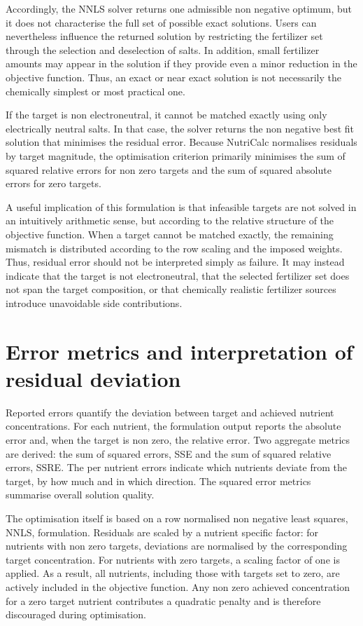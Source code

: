 \documentclass[
  letterpaper,
  DIV=11,
  numbers=noendperiod]{scrreprt}
\begin{document}
Accordingly, the NNLS solver returns one admissible non negative
optimum, but it does not characterise the full set of possible exact
solutions. Users can nevertheless influence the returned solution by
restricting the fertilizer set through the selection and deselection of
salts. In addition, small fertilizer amounts may appear in the solution
if they provide even a minor reduction in the objective function. Thus,
an exact or near exact solution is not necessarily the chemically
simplest or most practical one.

If the target is non electroneutral, it cannot be matched exactly using
only electrically neutral salts. In that case, the solver returns the
non negative best fit solution that minimises the residual error.
Because NutriCalc normalises residuals by target magnitude, the
optimisation criterion primarily minimises the sum of squared relative
errors for non zero targets and the sum of squared absolute errors for
zero targets.

A useful implication of this formulation is that infeasible targets are
not solved in an intuitively arithmetic sense, but according to the
relative structure of the objective function. When a target cannot be
matched exactly, the remaining mismatch is distributed according to the
row scaling and the imposed weights. Thus, residual error should not be
interpreted simply as failure. It may instead indicate that the target
is not electroneutral, that the selected fertilizer set does not span
the target composition, or that chemically realistic fertilizer sources
introduce unavoidable side contributions.

\section{Error metrics and interpretation of residual
deviation}\label{error-metrics-and-interpretation-of-residual-deviation}

Reported errors quantify the deviation between target and achieved
nutrient concentrations. For each nutrient, the formulation output
reports the absolute error and, when the target is non zero, the
relative error. Two aggregate metrics are derived: the sum of squared
errors, SSE and the sum of squared relative errors, SSRE. The per
nutrient errors indicate which nutrients deviate from the target, by how
much and in which direction. The squared error metrics summarise overall
solution quality.

The optimisation itself is based on a row normalised non negative least
squares, NNLS, formulation. Residuals are scaled by a nutrient specific
factor: for nutrients with non zero targets, deviations are normalised
by the corresponding target concentration. For nutrients with zero
targets, a scaling factor of one is applied. As a result, all nutrients,
including those with targets set to zero, are actively included in the
objective function. Any non zero achieved concentration for a zero
target nutrient contributes a quadratic penalty and is therefore
discouraged during optimisation.
\end{document}
